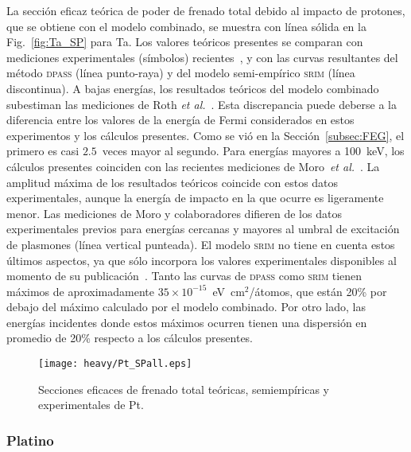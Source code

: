 La sección eficaz teórica de poder de frenado total debido al 
impacto de protones, que se obtiene con el modelo combinado, 
se muestra con línea sólida en la Fig.~\ref{fig:Ta_SP} para Ta. Los 
valores teóricos presentes se comparan con mediciones experimentales 
(símbolos) recientes~\cite{Moro:20,Roth:17,iaea,Shiomi:96,Shiomi:94,
Bichsel:92,Ogino:88,Sirotinin:84,Krist:83}, y con las curvas resultantes 
del método \textsc{dpass} (línea punto-raya) y del modelo semi-empírico 
\textsc{srim} (línea discontinua). A bajas energías, los resultados 
teóricos del modelo combinado subestiman las mediciones de Roth 
\textit{et al.}~\cite{Roth:17}. Esta discrepancia puede deberse a la 
diferencia entre los valores de la energía de Fermi considerados en 
estos experimentos y los cálculos presentes. Como se vió en la 
Sección~\ref{subsec:FEG}, el primero es casi $2.5$~veces mayor al 
segundo. Para energías mayores a 100~keV, los cálculos presentes 
coinciden con las recientes mediciones de 
Moro~\textit{et al.}~\cite{Moro:20}. La amplitud máxima de los 
resultados teóricos coincide con estos datos experimentales, aunque la 
energía de impacto en la que ocurre es ligeramente menor. Las mediciones 
de Moro y colaboradores difieren de los datos experimentales previos 
para energías cercanas y mayores al umbral de excitación de plasmones 
(línea vertical punteada). El modelo \textsc{srim} no tiene en cuenta 
estos últimos aspectos, ya que sólo incorpora los valores experimentales 
disponibles al momento de su publicación~\cite{iaea}. Tanto las curvas 
de \textsc{dpass} como \textsc{srim} tienen máximos de aproximadamente 
$35\times 10^{-15}$~eV~cm$^2$/átomos, que están 20\% por debajo del 
máximo calculado por el modelo combinado. Por otro lado, las energías 
incidentes donde estos máximos ocurren tienen una dispersión en promedio 
de 20\% respecto a los cálculos presentes. 

\begin{figure}[t]
\centering
\texttt{[image: heavy/Pt\_SPall.eps]}
\caption[Secciones eficaces teóricas, semiempíricas y experimentales de 
Pt.]
{Secciones eficaces de frenado total teóricas, semiempíricas y
experimentales de Pt.}
\label{fig:Pt_SP}
\end{figure}

\subsubsection{Platino}

